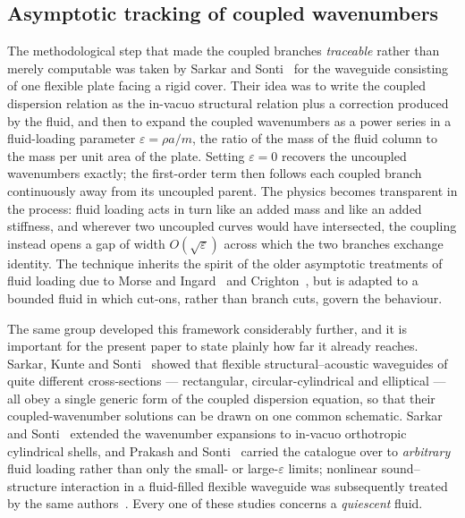 \documentclass[11pt,a4paper]{article}
\newcommand{\eps}{\varepsilon}
\theoremstyle{plain}
\theoremstyle{remark}
\begin{document}
\subsection{Asymptotic tracking of coupled wavenumbers}
The methodological step that made the coupled branches \emph{traceable} rather than merely computable
was taken by Sarkar and Sonti~\cite{sarkarsonti} for the waveguide consisting of one flexible plate
facing a rigid cover. Their idea was to write the coupled dispersion relation as the in-vacuo
structural relation plus a correction produced by the fluid, and then to expand the coupled wavenumbers
as a power series in a fluid-loading parameter $\eps=\rho a/m$, the ratio of the mass of the fluid
column to the mass per unit area of the plate. Setting $\eps=0$ recovers the uncoupled wavenumbers
exactly; the first-order term then follows each coupled branch continuously away from its uncoupled
parent. The physics becomes transparent in the process: fluid loading acts in turn like an added mass
and like an added stiffness, and wherever two uncoupled curves would have intersected, the coupling
instead opens a gap of width $O(\sqrt\eps)$ across which the two branches exchange identity. The
technique inherits the spirit of the older asymptotic treatments of fluid loading due to Morse and
Ingard~\cite{morseingard} and Crighton~\cite{crighton,crighton1992}, but is adapted to a bounded fluid
in which cut-ons, rather than branch cuts, govern the behaviour.

The same group developed this framework considerably further, and it is important for the present paper
to state plainly how far it already reaches. Sarkar, Kunte and Sonti~\cite{kunte2011} showed that
flexible structural--acoustic waveguides of quite different cross-sections --- rectangular,
circular-cylindrical and elliptical --- all obey a single generic form of the coupled dispersion
equation, so that their coupled-wavenumber solutions can be drawn on one common schematic. Sarkar and
Sonti~\cite{sarkarsonti2011} extended the wavenumber expansions to in-vacuo orthotropic cylindrical
shells, and Prakash and Sonti~\cite{prakash2016} carried the catalogue over to \emph{arbitrary} fluid
loading rather than only the small- or large-$\eps$ limits; nonlinear sound--structure interaction in a
fluid-filled flexible waveguide was subsequently treated by the same authors~\cite{prakash2019}. Every
one of these studies concerns a \emph{quiescent} fluid.
\end{document}

